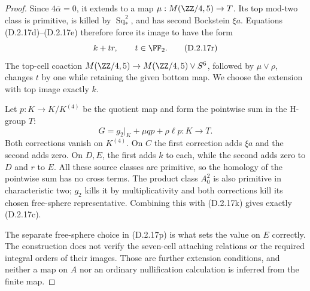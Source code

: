 \begin{proof}
Since $4\overline\alpha=0$, it extends to a map
$\mu:M(\ZZ/4,5)\to T$. Its top mod-two class is primitive,
is killed by $\operatorname{Sq}_*^2$, and has second
Bockstein $\xi a$. Equations \textup{(D.2.17d)--(D.2.17e)}
therefore force its image to have the form
\[
 k+t r,\qquad t\in\FF_2.
 \tag{D.2.17r}
\]
The top-cell coaction
$M(\ZZ/4,5)\to M(\ZZ/4,5)\vee S^6$, followed by
$\mu\vee\rho$, changes $t$ by one while retaining the given
bottom map. We choose the extension with top image exactly $k$.

Let $p:K\to K/K^{(4)}$ be the quotient map and form the
pointwise sum in the H-group $T$:
\[
 G=g_2|_K+\mu q p+\rho\ell p:K\longrightarrow T.
 \tag{D.2.17s}
\]
Both corrections vanish on $K^{(4)}$. On $C$ the first
correction adds $\xi a$ and the second adds zero. On $D,E$,
the first adds $k$ to each, while the second adds zero to $D$
and $r$ to $E$. All these source classes are primitive, so
the homology of the pointwise sum has no cross terms. The
product class $A_0^2$ is also primitive in characteristic two;
$g_2$ kills it by multiplicativity and both corrections kill
its chosen free-sphere representative. Combining this with
\textup{(D.2.17k)} gives exactly \textup{(D.2.17c)}.

The separate free-sphere choice in \textup{(D.2.17p)} is what
sets the value on $E$ correctly. The construction does not
verify the seven-cell attaching relations or the required
integral orders of their images. Those are further extension
conditions, and neither a map on $A$ nor an ordinary
nullification calculation is inferred from the finite map.
\end{proof}

